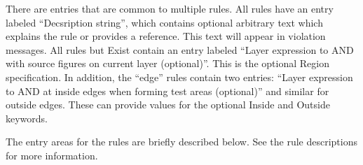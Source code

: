 There are entries that are common to multiple rules.  All rules have
an entry labeled ``{\cb Decsription string}'', which contains optional
arbitrary text which explains the rule or provides a reference.  This
text will appear in violation messages.  All rules but {\et Exist}
contain an entry labeled ``{\cb Layer expression to AND with source
figures on current layer (optional)}''.  This is the optional {\et
Region} specification.  In addition, the ``edge'' rules contain two
entries:  ``{\cb Layer expression to AND at inside edges when forming
test areas (optional)}'' and similar for outside edges.  These can
provide values for the optional {\et Inside} and {\et Outside}
keywords.

The entry areas for the rules are briefly described below.  See
the rule descriptions for more information.

